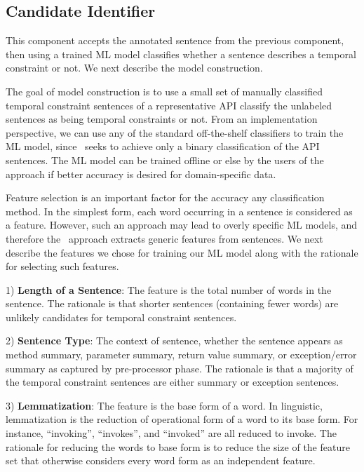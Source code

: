 \subsection{Candidate Identifier}

This component accepts the annotated sentence from the previous component,
then using a trained ML model classifies whether a sentence describes a temporal constraint or not. We next describe the model construction.

The goal of model construction is to use a small set of manually classified temporal constraint sentences of a representative API classify the unlabeled sentences as being temporal constraints or not.
From an implementation perspective, we can use any of the standard off-the-shelf classifiers to train the ML model, since \tool\ seeks to achieve only a binary classification of the API sentences.
The ML model can be trained offline or else by the users of the approach if better accuracy is desired for domain-specific data.

Feature selection is an important factor for the accuracy any classification method.
In the simplest form, each word occurring in a sentence is considered as a feature. However, such an approach may lead to overly specific ML models, and therefore the \tool\ approach extracts generic features from sentences. We next describe the features we chose for training our ML model along with the rationale for selecting such features.


1) \textbf{Length of a Sentence}: The feature is the total number of words in  the sentence. The rationale is that shorter sentences (containing fewer words) are unlikely candidates for temporal constraint sentences. 

2) \textbf{Sentence Type}: The context of sentence, whether the sentence appears as method summary, parameter summary, return value summary, or exception/error summary as captured by pre-processor phase. The rationale is that a majority of the temporal constraint sentences are either summary or exception sentences. 
	
3) \textbf{Lemmatization}: The feature is the base form of a word. In linguistic, lemmatization is the reduction of operational form of a word to its base form. For instance, ``invoking'', ``invokes'', and ``invoked'' are all reduced to invoke. The rationale for reducing the words to base form is to reduce the size of the feature set that otherwise considers every word form as an independent feature.  
	
